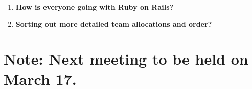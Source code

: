 \documentclass[10pt,english, a4paper]{article}
\begin{document}
\begin{enumerate}
\item \textbf{\huge How is everyone going with Ruby on Rails?}{\huge \par}
\item \textbf{\huge Sorting out more detailed team allocations and order?}{\huge \par}
\end{enumerate}

\section*{\huge %
\vspace*{20pt}
Note: Next meeting to be held on March 17.}
\end{document}
